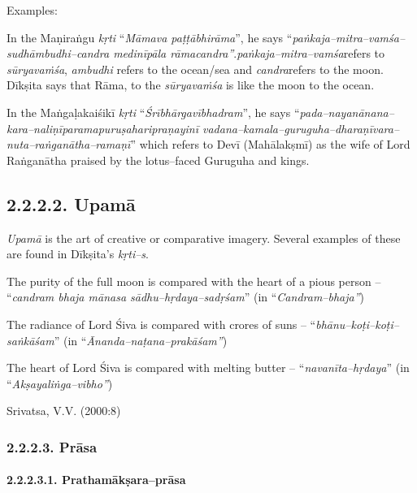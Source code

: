 Examples:

\item In the Maṇiraṅgu \textit{kṛti} “\textit{Māmava paṭṭābhirāma}”, he says “\textit{paṅkaja–mitra–vamśa–sudhāmbudhi–candra medinīpāla rāmacandra”}.\textit{paṅkaja–mitra–vamśa}refers to \textit{sūryavaṁśa}, \textit{ambudhi} refers to the ocean/sea and \textit{ candra}refers to the moon. Dīkṣita says that Rāma, to the \textit{sūryavaṁśa} is like the moon to the ocean.

 \item In the Maṅgaḷakaiśikī \textit{kṛti} “\textit{Śrībhārgavībhadram}”, he says “\textit{pada–nayanānana–kara–naliṇīparamapuruṣaharipraṇayinī vadana–kamala–guruguha–dharaṇīvara–nuta–raṅganātha–ramaṇī}” which refers to Devī (Mahālakṣmī) as the wife of Lord Raṅganātha praised by the lotus–faced Guruguha and kings.



\subsection*{2.2.2.2. Upamā}

\textit{Upamā} is the art of creative or comparative imagery. Several examples of these are found in Dīkṣita’s \textit{kṛti–s}.

\item The purity of the full moon is compared with the heart of a pious person – “\textit{candram bhaja mānasa sādhu–hṛdaya–sadṛśam}” (in “\textit{Candram–bhaja”})

 \item The radiance of Lord Śiva is compared with crores of suns – “\textit{bhānu–koṭi–koṭi–saṅkāśam}” (in “\textit{Ānanda–naṭana–prakāśam”})

 \item The heart of Lord Śiva is compared with melting butter – “\textit{navanīta–hṛdaya}” (in “\textit{Akṣayaliṅga–vibho”})


\begin{flushright}
Srivatsa, V.V. (2000:8)
\end{flushright}


\subsubsection*{2.2.2.3. Prāsa}

\paragraph*{2.2.2.3.1. Prathamākṣara–prāsa}

